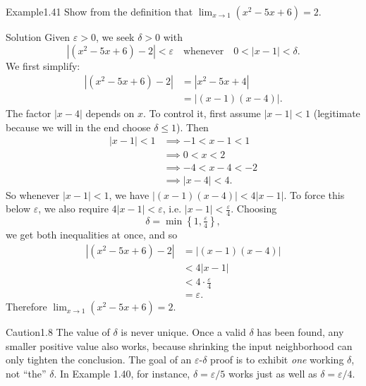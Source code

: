 \documentclass[a4paper,12pt,oneside]{memoir}
\begin{document}
\begin{workedexample}
\begin{envexample}{Example}{1.41}{}
Show from the definition that \(\lim_{x \to 1} (x^{2} - 5x + 6) = 2\).
\end{envexample}
\begin{envsolution}{Solution}{}{}
Given \(\varepsilon > 0\), we seek \(\delta > 0\) with \[ |(x^{2} - 5x + 6) - 2| < \varepsilon \quad \text{whenever} \quad 0 < |x - 1| < \delta. \] We first simplify: \[ \begin{aligned} |(x^{2} - 5x + 6) - 2| &= |x^{2} - 5x + 4|\\ &= |(x - 1)(x - 4)|. \end{aligned} \] The factor \(|x - 4|\) depends on \(x\). To control it, first assume \(|x - 1| < 1\) (legitimate because we will in the end choose \(\delta \le 1\)). Then \[ \begin{aligned} |x - 1| < 1 &\implies -1 < x - 1 < 1\\ &\implies 0 < x < 2\\ &\implies -4 < x - 4 < -2\\ &\implies |x - 4| < 4. \end{aligned} \] So whenever \(|x - 1| < 1\), we have \(|(x - 1)(x - 4)| < 4 |x - 1|\). To force this below \(\varepsilon\), we also require \(4 |x - 1| < \varepsilon\), i.e. \(|x - 1| < \tfrac{\varepsilon}{4}\). Choosing \[ \delta = \min\!\left\{1, \tfrac{\varepsilon}{4}\right\}, \] we get both inequalities at once, and so \[ \begin{aligned} |(x^{2} - 5x + 6) - 2| &= |(x - 1)(x - 4)|\\ &< 4 |x - 1|\\ &< 4 \cdot \tfrac{\varepsilon}{4}\\ &= \varepsilon. \end{aligned} \] Therefore \(\lim_{x \to 1} (x^{2} - 5x + 6) = 2\).
\end{envsolution}
\end{workedexample}
\begin{envcaution}{Caution}{1.8}{}
The value of \(\delta\) is never unique. Once a valid \(\delta\) has been found, any smaller positive value also works, because shrinking the input neighborhood can only tighten the conclusion. The goal of an \(\varepsilon\text{-}\delta\) proof is to exhibit \emph{one} working \(\delta\), not “the” \(\delta\). In Example 1.40, for instance, \(\delta = \varepsilon/5\) works just as well as \(\delta = \varepsilon/4\).
\end{envcaution}
\end{document}

